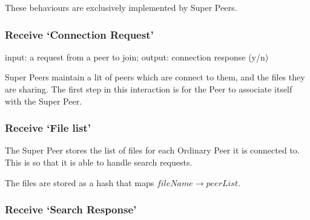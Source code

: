 These behaviours are exclusively implemented by Super Peers.

\subsubsection{Receive `Connection Request'}
input: a request from a peer to join; output: connection response (y/n)

Super Peers maintain a lit of peers which are connect to them, and the files
they are sharing.  The first step in this interaction is for the Peer to
associate itself with the Super Peer.

\begin{algorithm}[H]

\end{algorithm}


\subsubsection{Receive `File list'}

The Super Peer stores the list of files for each Ordinary Peer it is connected
to. This is so that it is able to handle search requests.

The files are stored as a hash that maps $fileName \rightarrow peerList$.

\begin{algorithm}[H]

\end{algorithm}

\subsubsection{Receive `Search Response'}

